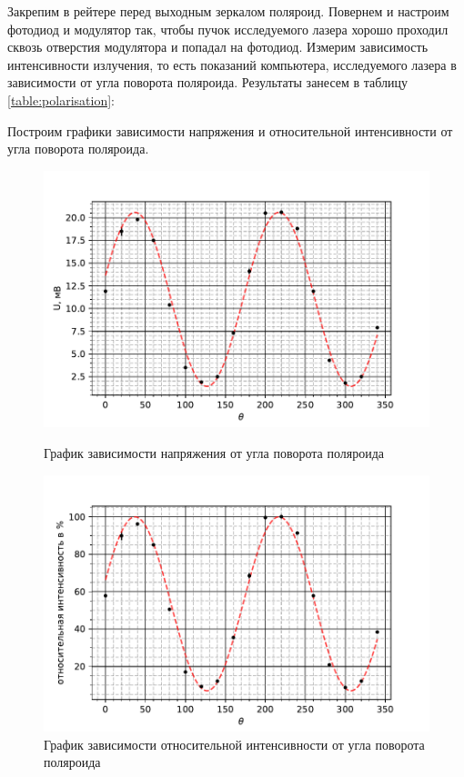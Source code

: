     Закрепим в рейтере перед выходным зеркалом поляроид. Повернем и настроим фотодиод и модулятор так, чтобы пучок исследуемого лазера хорошо проходил сквозь отверстия модулятора и попадал на фотодиод. Измерим зависимость интенсивности излучения, то есть показаний компьютера, исследуемого лазера в зависимости от угла поворота поляроида. Результаты занесем в таблицу \ref{table:polarisation}:
    
    
    
    Построим графики зависимости напряжения и относительной интенсивности от угла поворота поляроида.
    
    \begin{figure}[h!]
    	\begin{center}
    		\begin{minipage}[h!]{0.48\linewidth}
    			\includegraphics[width=1\linewidth]{images/polarisation.pdf}
    			\caption{График зависимости напряжения от угла поворота поляроида}
    			\label{image:polarisation}
    		\end{minipage}
    		\hfill
    		\begin{minipage}[h!]{0.48\linewidth}
    			\includegraphics[width=1\linewidth]{images/relative_polarisation.pdf}
    			\caption{График зависимости относительной интенсивности от угла поворота поляроида}
    			\label{image:relative_polarisation}
    		\end{minipage}
    	\end{center}
    \end{figure}

